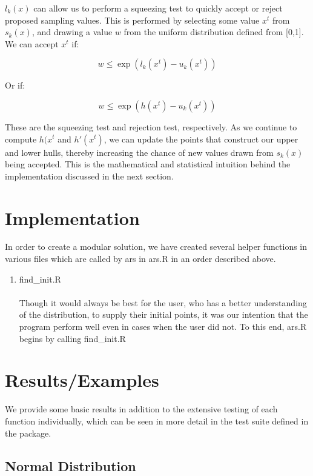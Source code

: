 \documentclass[12pt, oneside]{article}
\begin{document}
\(l_k(x) \) can allow us to perform a squeezing test to quickly accept or reject proposed sampling values.  This is performed by selecting some value \(x^t\) from \(s_k(x)\), and drawing a value \(w\) from the uniform distribution defined from [0,1].  We can accept \(x^t\) if:

\[ w \le \exp(l_k(x^t) - u_k(x^t)) \]

Or if:

\[ w \le \exp(h(x^t) - u_k(x^t)) \]

These are the squeezing test and rejection test, respectively.  As we continue to compute \(h(x^t\) and \(h'(x^t)\), we can update the points that construct our upper and lower hulls, thereby increasing the chance of new values drawn from \(s_k(x)\) being accepted.  This is the mathematical and statistical intuition behind the implementation discussed in the next section.

\section{Implementation}

In order to create a modular solution, we have created several helper functions in various files which are called by ars in ars.R in an order described above.
\begin{enumerate}
\item find\_init.R\\\\
Though it would always be best for the user, who has a better understanding of the distribution, to supply their initial points, it was our intention that the program perform well even in cases when the user did not.  To this end, ars.R begins by calling find\_init.R

\end{enumerate}

\section{Results/Examples}

We provide some basic results in addition to the extensive testing of each function individually, which can be seen in more detail in the test suite defined in the package.

\subsection{Normal Distribution}
\end{document}
